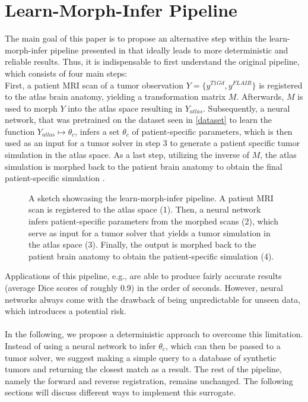 \section{Learn-Morph-Infer Pipeline}\label{pipeline}
The main goal of this paper is to propose an alternative step within the learn-morph-infer pipeline presented in \parencite{LearnMorphInfer} that ideally leads to more deterministic and reliable results.
Thus, it is indispensable to first understand the original pipeline, which consists of four main steps:\\
First, a patient MRI scan of a tumor observation $Y = \{y^{T1Gd}, y^{FLAIR}\}$ is registered to the atlas brain anatomy, yielding a transformation matrix $M$.
Afterwards, $M$ is used to morph $Y$ into the atlas space resulting in $Y_{atlas}$.
Subsequently, a neural network, that was pretrained on the dataset seen in \autoref{dataset} to learn the function $Y_{atlas} \mapsto \theta_c$, infers a set $\theta_c$ of patient-specific parameters, which is then used as an input for a tumor solver in step 3 to generate a patient specific tumor simulation in the atlas space. 
As a last step, utilizing the inverse of $M$, the atlas simulation is morphed back to the patient brain anatomy to obtain the final patient-specific simulation \parencite{LearnMorphInfer}.

\begin{figure}[htbp]
  \centering
  
  \caption{A sketch showcasing the learn-morph-infer pipeline. A patient MRI scan is registered to the atlas space (1). Then, a neural network infers patient-specific parameters from the morphed scans (2), which serve as input for a tumor solver that yields a tumor simulation in the atlas space (3). Finally, the output is morphed back to the patient brain anatomy to obtain the patient-specific simulation (4).}
\end{figure}

Applications of this pipeline, e.g.\parencite{Scibilia2021}, are able to produce fairly accurate results (average Dice scores of roughly 0.9) in the order of seconds. However, neural networks always come with the drawback of being unpredictable for unseen data, which introduces a potential risk.\\\\
In the following, we propose a deterministic approach to overcome this limitation. Instead of using a neural network to infer $\theta_c$, which can then be passed to a tumor solver, we suggest making a simple query to a database of synthetic tumors and returning the closest match as a result. The rest of the pipeline, namely the forward and reverse registration, remains unchanged. The following sections will discuss different ways to implement this surrogate.

